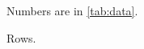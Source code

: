 \documentclass{article}
\begin{document}
Numbers are in \autoref{tab:data}.
\begin{table}[h]
\centering
Rows.
\caption{Data}\label{tab:data}
\end{table}
\end{document}
